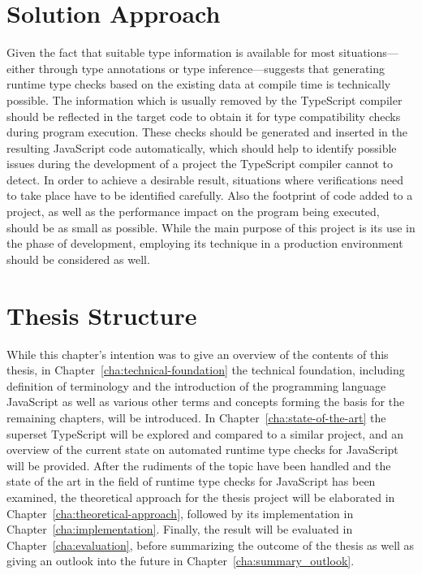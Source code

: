\section{Solution Approach}
\label{sec:solution-approach}

Given the fact that suitable type information is available for most situations---either through type annotations or type inference---suggests that generating runtime type checks based on the existing data at compile time is technically possible. The information which is usually removed by the TypeScript compiler should be reflected in the target code to obtain it for type compatibility checks during program execution. These checks should be generated and inserted in the resulting JavaScript code automatically, which should help to identify possible issues during the development of a project the TypeScript compiler cannot to detect. In order to achieve a desirable result, situations where verifications need to take place have to be identified carefully. Also the footprint of code added to a project, as well as the performance impact on the program being executed, should be as small as possible. While the main purpose of this project is its use in the phase of development, employing its technique in a production environment should be considered as well.

\section{Thesis Structure}
\label{sec:thesis-structure}

While this chapter's intention was to give an overview of the contents of this thesis, in Chapter~\ref{cha:technical-foundation} the technical foundation, including definition of terminology and the introduction of the programming language JavaScript as well as various other terms and concepts forming the basis for the remaining chapters, will be introduced. In Chapter~\ref{cha:state-of-the-art} the superset TypeScript will be explored and compared to a similar project, and an overview of the current state on automated runtime type checks for JavaScript will be provided. After the rudiments of the topic have been handled and the state of the art in the field of runtime type checks for JavaScript has been examined, the theoretical approach for the thesis project will be elaborated in Chapter~\ref{cha:theoretical-approach}, followed by its implementation in Chapter~\ref{cha:implementation}. Finally, the result will be evaluated in Chapter~\ref{cha:evaluation}, before summarizing the outcome of the thesis as well as giving an outlook into the future in Chapter~\ref{cha:summary_outlook}.
